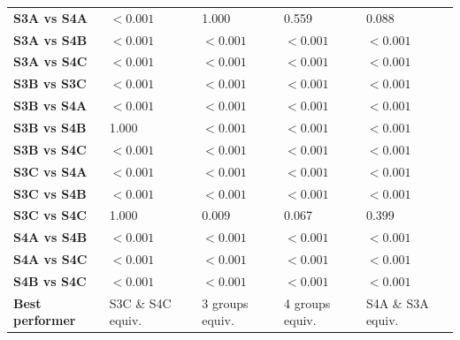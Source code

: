 \begin{table}[H]
{\begin{tabular}{lllll}
        \textbf{S3A vs S4A} & $< 0.001$ & 1.000 & 0.559 & 0.088 \\
        \textbf{S3A vs S4B} & $< 0.001$ & $< 0.001$ & $< 0.001$ & $< 0.001$ \\
        \textbf{S3A vs S4C} & $< 0.001$ & $< 0.001$ & $< 0.001$ & $< 0.001$ \\
        \textbf{S3B vs S3C} & $< 0.001$ & $< 0.001$ & $< 0.001$ & $< 0.001$ \\
        \textbf{S3B vs S4A} & $< 0.001$ & $< 0.001$ & $< 0.001$ & $< 0.001$ \\
        \textbf{S3B vs S4B} & 1.000 & $< 0.001$ & $< 0.001$ & $< 0.001$ \\
        \textbf{S3B vs S4C} & $< 0.001$ & $< 0.001$ & $< 0.001$ & $< 0.001$ \\
        \textbf{S3C vs S4A} & $< 0.001$ & $< 0.001$ & $< 0.001$ & $< 0.001$ \\
        \textbf{S3C vs S4B} & $< 0.001$ & $< 0.001$ & $< 0.001$ & $< 0.001$ \\
        \textbf{S3C vs S4C} & 1.000 & 0.009 & 0.067 & 0.399 \\
        \textbf{S4A vs S4B} & $< 0.001$ & $< 0.001$ & $< 0.001$ & $< 0.001$ \\
        \textbf{S4A vs S4C} & $< 0.001$ & $< 0.001$ & $< 0.001$ & $< 0.001$ \\
        \textbf{S4B vs S4C} & $< 0.001$ & $< 0.001$ & $< 0.001$ & $< 0.001$ \\
        \textbf{Best performer} & S3C \& S4C equiv. & 3 groups equiv. & 4 groups equiv. & S4A \& S3A equiv. \\
        \bottomrule
    \end{tabular}}
\end{table}